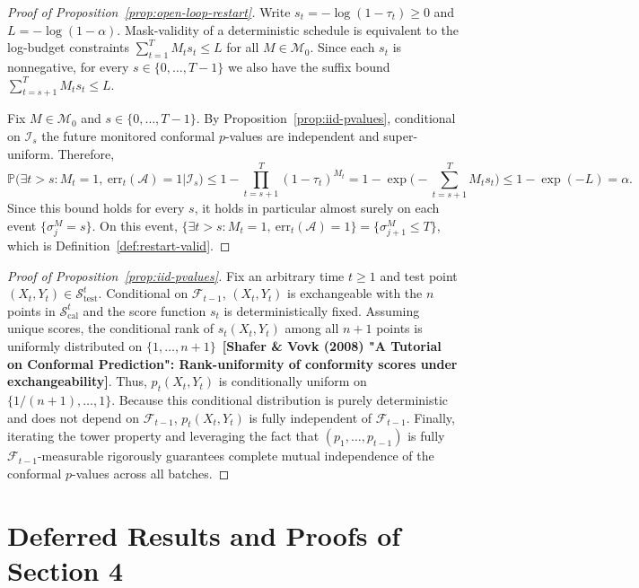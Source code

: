 \documentclass{uai2026} %
\newcommand{\1}{\mathbf{1}}
\newcommand{\prob}{\mathbb{P}}
\newcommand{\test}{\mathrm{test}}
\newcommand{\scal}{\mathcal{S}}
\newcommand{\err}{\mathrm{err}}
\newcommand{\F}{\mathcal{F}}
\newcommand{\fcal}{\F}
\newcommand{\mcal}{\mathcal{M}}
\newcommand{\cali}{\mathrm{cal}}
\newcommand{\scalcal}{\scal_{\cali}}
\newcommand{\scaltest}{\scal_{\test}}
\newcommand{\citeneeded}[1][]{{\color{red}\textbf{[#1]}}}
\newcommand{\acal}{\mathcal{A}}
\begin{document}
\begin{proof}[Proof of Proposition~\ref{prop:open-loop-restart}]
  Write $s_t=-\log(1-\tau_t)\ge 0$ and $L=-\log(1-\alpha)$.
  Mask-validity of a deterministic schedule is equivalent to the log-budget constraints $\sum_{t=1}^{T} M_t s_t\le L$ for all $M\in\mcal_0$.
  Since each $s_t$ is nonnegative, for every $s\in\{0,\dots,T-1\}$ we also have the suffix bound $\sum_{t=s+1}^{T} M_t s_t\le L$.

  Fix $M\in\mcal_0$ and $s\in\{0,\dots,T-1\}$.
  By Proposition~\ref{prop:iid-pvalues}, conditional on $\mathcal{I}_s$ the future monitored conformal $p$-values are independent and super-uniform.
  Therefore,
  \begin{equation*}
    \prob\Big(\exists t>s\colon M_t=1,\ \err_t(\acal)=1 \Big| \mathcal{I}_s\Big)
    \le 1-\prod_{t=s+1}^{T} (1-\tau_t)^{M_t}
    = 1-\exp\Big(-\sum_{t=s+1}^{T} M_t s_t\Big)
    \le 1-\exp(-L)
    = \alpha.
  \end{equation*}
  Since this bound holds for every $s$, it holds in particular almost surely on each event $\{\sigma_j^{M}=s\}$.
  On this event, $\{\exists t>s\colon M_t=1,\ \err_t(\acal)=1\}=\{\sigma_{j+1}^{M}\le T\}$, which is Definition~\ref{def:restart-valid}.
\end{proof}\par\medskip

\begin{proof}[Proof of Proposition~\ref{prop:iid-pvalues}]
  Fix an arbitrary time $t \ge 1$ and test point $(X_t, Y_t) \in \scaltest^t$. Conditional on $\fcal_{t-1}$, $(X_t, Y_t)$ is exchangeable with the $n$ points in $\scalcal^t$ and the score function $s_t$ is deterministically fixed. Assuming unique scores, the conditional rank of $s_t(X_t, Y_t)$ among all $n+1$ points is uniformly distributed on $\{1, \dots, n+1\}$~\citeneeded[Shafer \& Vovk (2008) "A Tutorial on Conformal Prediction": Rank-uniformity of conformity scores under exchangeability].
  Thus, $p_t(X_t, Y_t)$ is conditionally uniform on $\{1/(n+1), \dots, 1\}$.
  Because this conditional distribution is purely deterministic and does not depend on $\fcal_{t-1}$, $p_t(X_t, Y_t)$ is fully independent of $\fcal_{t-1}$.
  Finally, iterating the tower property and leveraging the fact that $(p_1, \dots, p_{t-1})$ is fully $\fcal_{t-1}$-measurable rigorously guarantees complete mutual independence of the conformal $p$-values across all batches.
\end{proof}

\section{Deferred Results and Proofs of Section 4}
\label{app:proofs_4}
\end{document}
